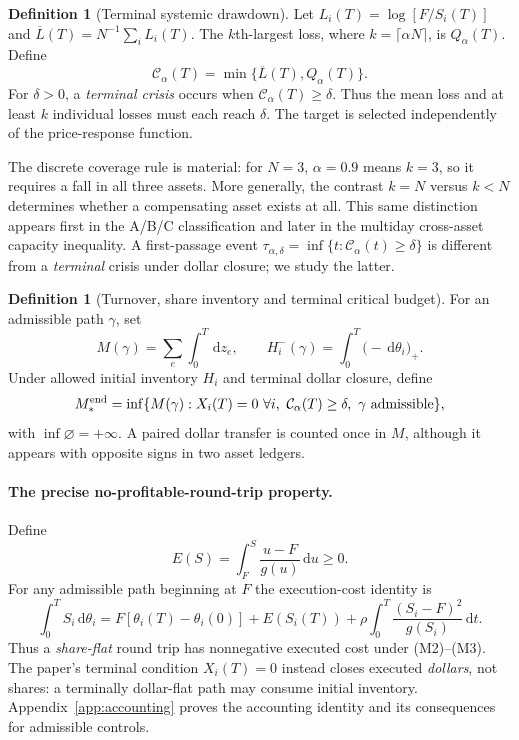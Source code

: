 \documentclass[11pt]{article}
\numberwithin{equation}{section}
\theoremstyle{definition}
\newtheorem{definition}[theorem]{Definition}
\theoremstyle{remark}
\newcommand{\Cris}{\mathcal{C}}
\newcommand{\dd}{\,\mathrm{d}}
\begin{document}
\begin{definition}[Terminal systemic drawdown]\label{def:crash}
Let $L_i(T)=\log[F/S_i(T)]$ and $\overline L(T)=N^{-1}\sum_i L_i(T)$. The $k$th-largest loss, where $k=\lceil\alpha N\rceil$, is $Q_\alpha(T)$. Define
\begin{equation}\label{eq:crash}
\boxed{\Cris_\alpha(T)=\min\{\overline L(T),Q_\alpha(T)\}.}
\end{equation}
For $\delta>0$, a \emph{terminal crisis} occurs when $\Cris_\alpha(T)\ge\delta$. Thus the mean loss and at least $k$ individual losses must each reach $\delta$. The target is selected independently of the price-response function.
\end{definition}

The discrete coverage rule is material: for $N=3$, $\alpha=0.9$ means $k=3$, so it requires a fall in all three assets. More generally, the contrast $k=N$ versus $k<N$ determines whether a compensating asset exists at all. This same distinction appears first in the A/B/C classification and later in the multiday cross-asset capacity inequality. A first-passage event $\tau_{\alpha,\delta}=\inf\{t:\Cris_\alpha(t)\ge\delta\}$ is different from a \emph{terminal} crisis under dollar closure; we study the latter.

\begin{definition}[Turnover, share inventory and terminal critical budget]\label{def:budget}
For an admissible path $\gamma$, set
\begin{equation}\label{eq:resource}
M(\gamma)=\sum_e\int_0^T\dd z_e,\qquad
H_i^-(\gamma)=\int_0^T\big(-\dd\theta_i\big)_+.
\end{equation}
Under allowed initial inventory $H_i$ and terminal dollar closure, define
\begin{equation}\label{eq:minbudget}
M_*^{\rm end}=\inf\{M(\gamma): X_i(T)=0\ \forall i,\ \Cris_\alpha(T)\ge\delta,\ \gamma\text{ admissible}\},
\end{equation}
with $\inf\varnothing=+\infty$. A paired dollar transfer is counted once in $M$, although it appears with opposite signs in two asset ledgers.
\end{definition}

\paragraph{The precise no-profitable-round-trip property.} Define
\begin{equation}\label{eq:E}
E(S)=\int_F^S\frac{u-F}{g(u)}\dd u\ge0.
\end{equation}
For any admissible path beginning at $F$ the execution-cost identity is
\begin{equation}\label{eq:cost}
\boxed{\int_0^T S_i\dd\theta_i=F[\theta_i(T)-\theta_i(0)]+E(S_i(T))
+\rho\int_0^T\frac{(S_i-F)^2}{g(S_i)}\dd t.}
\end{equation}
Thus a \emph{share-flat} round trip has nonnegative executed cost under (M2)--(M3). The paper's terminal condition $X_i(T)=0$ instead closes executed \emph{dollars}, not shares: a terminally dollar-flat path may consume initial inventory. Appendix~\ref{app:accounting} proves the accounting identity and its consequences for admissible controls.
\end{document}
